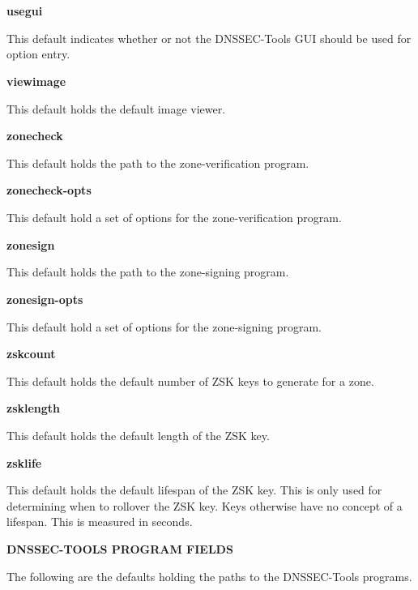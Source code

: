 \begin{description}
\item {\bf usegui}\verb" "

This default indicates whether or not the DNSSEC-Tools GUI should be used for
option entry.

\item {\bf viewimage}\verb" "

This default holds the default image viewer.

\item {\bf zonecheck}\verb" "

This default holds the path to the zone-verification program.

\item {\bf zonecheck-opts}\verb" "

This default hold a set of options for the zone-verification program.

\item {\bf zonesign}\verb" "

This default holds the path to the zone-signing program.

\item {\bf zonesign-opts}\verb" "

This default hold a set of options for the zone-signing program.

\item {\bf zskcount}\verb" "

This default holds the default number of ZSK keys to generate for a zone.

\item {\bf zsklength}\verb" "

This default holds the default length of the ZSK key.

\item {\bf zsklife}\verb" "

This default holds the default lifespan of the ZSK key.  This is only used
for determining when to rollover the ZSK key.  Keys otherwise have no
concept of a lifespan.  This is measured in seconds.

\end{description}

{\bf DNSSEC-TOOLS PROGRAM FIELDS}

The following are the defaults holding the paths to the DNSSEC-Tools
programs.

